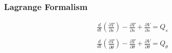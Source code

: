 
\begin{frame}
	\frametitle{Lagrange Formalism}
	
	\begin{align*}
	  &\frac{d}{dt}\left(\frac{\partial T}{\partial \dot{s}}\right) -
	  \frac{\partial T}{\partial s} +
	  \frac{\partial V}{\partial s}
	  = Q_s \\
	  &{}\\
	  &\frac{d}{dt}\left(\frac{\partial T}{\partial \dot{\theta}}\right) -
	  \frac{\partial T}{\partial \theta} +
	  \frac{\partial V}{\partial \theta}
	  = Q_{\theta} \\
	\end{align*}
\end{frame}

